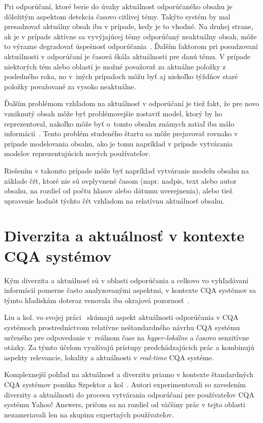 Pri odporúčaní, ktoré berie do úvahy aktuálnosť odporúčaného obsahu je dôležitým aspektom detekcia časovo citlivej témy.
Takýto systém by mal presadzovať aktuálny obsah iba v prípade, kedy je to vhodné. Na druhej strane, ak je v prípade
aktívne sa vyvýjajúcej témy odporúčaný neaktuálny obsah, môže to výrazne degradovať úspešnosť odporúčania~\cite{Dong2010}.
Ďalším faktorom pri posudzovaní aktuálnosti v odporúčaní je časová škála aktuálnosti pre danú tému.
V prípade niektorých tém alebo oblastí je možné považovať za aktuálne položky z posledného roka, no v~iných prípadoch
môžu byť aj niekoľko týždňov staré položky považované za vysoko neaktuálne.

Ďalším problémom vzhľadom na aktuálnosť v odporúčaní je tiež fakt, že pre novo vzniknutý obsah môže byť problémovejšie
zostaviť model, ktorý by ho reprezentoval, nakoľko môže byť o~tomto obsahu známych zatiaľ iba málo informácií~\cite{Dong2010TW}.
Tento problém studeného štartu sa môže prejavovať rovnako v prípade modelovania obsahu, ako je tomu napríklad v prípade
vytvárania modelov reprezentujúcich nových používateľov.

Riešením v takomto prípade môže byť napríklad vytváranie modelu
obsahu na základe čŕt, ktoré nie sú ovplyvnené časom (napr. nadpis, text alebo autor obsahu, na rozdiel od počtu hlasov
alebo dátumu uverejnenia), alebo tiež upravenie hodnôt týchto čŕt vzhľadom na relatívnu aktuálnosť obsahu.


\section{Diverzita a aktuálnosť v kontexte CQA systémov}

Kým diverzita a aktuálnosť sú v oblasti odporúčania a celkovo vo vyhľadávaní informácií pomerne často analyzovanými aspektmi,
v kontexte CQA systémov sa týmto hľadiskám doteraz venovala iba okrajová pozornosť~\cite{Srba2016}.

Liu a kol. vo svojej práci~\cite{Liu2015} skúmajú aspekt aktuálnosti odporúčania v CQA systémoch prostredníctvom
relatívne neštandardného návrhu CQA systému určeného pre odpovedanie v~reálnom čase na \emph{hyper-lokálne} a časovo senzitívne
otázky. Za týmto účelom využívajú prístupy predchádzajúcich prác a kombinujú aspekty relevancie, lokality a aktuálnosti
v \emph{real-time} CQA systéme.


Komplexnejší pohľad na aktuálnosť a diverzitu priamo v kontexte štandardných CQA systémov ponúka Szpektor a kol~\cite{Szpektor2013}.
Autori experimentovali so zavedením diverzity a aktuálnosti do procesu vytvárania odporúčaní pre používateľov CQA
systému Yahoo! Answers, pričom sa na rozdiel od väčšiny prác v tejto oblasti nezameriavali len na skupinu expertných používateľov.

